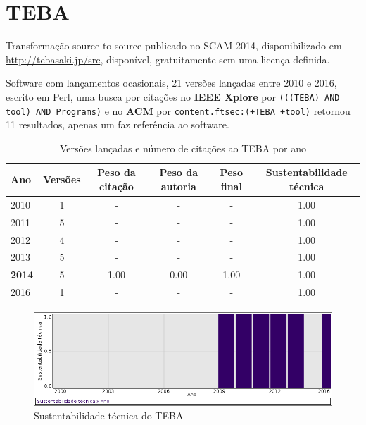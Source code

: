 \section{TEBA}

Transformação source-to-source
publicado no SCAM 2014,
disponibilizado em \url{http://tebasaki.jp/src},
disponível,
gratuitamente
sem uma licença definida.

Software com lançamentos ocasionais,
21 versões lançadas
entre 2010 e 2016,
escrito em Perl,
uma busca por citações no {\bf IEEE Xplore} por
\texttt{(((TEBA) AND tool) AND Programs)}
e no {\bf ACM} por
\texttt{content.ftsec:(+TEBA +tool)}
retornou
11 resultados,
apenas um faz referência ao software.


\begin{table}[H]
\caption{Versões lançadas e número de citações ao TEBA por ano}
\centering
\begin{tabular}{| l | c | c | c | c | c |}
  \hline
  Ano & Versões & Peso da citação & Peso da autoria & Peso final & Sustentabilidade técnica \\
  \hline
        2010 & 1 & - & - & -
        &
          {\color{blue} 1.00}
        \\
\hline
        2011 & 5 & - & - & -
        &
          {\color{blue} 1.00}
        \\
\hline
        2012 & 4 & - & - & -
        &
          {\color{blue} 1.00}
        \\
\hline
        2013 & 5 & - & - & -
        &
          {\color{blue} 1.00}
        \\
\hline
            {\bf 2014}
          &
          5
          &
          1.00
          &
          0.00
          &
          1.00
          &
            {\color{blue} 1.00}
          \\
\hline
        2016 & 1 & - & - & -
        &
          {\color{blue} 1.00}
        \\
\hline
\end{tabular}
\end{table}

\begin{figure}[h]
  \center
  \includegraphics[scale=0.50]{result-documents/charts/teba.png}
  \caption{Sustentabilidade técnica do TEBA}
\end{figure}


